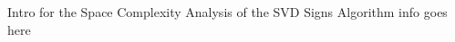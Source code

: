 \documentclass[../../ClusteringConnectionsMAIN.tex]{subfiles}
\begin{document}
\begin{flushleft}
\begin{large}

Intro for the Space Complexity Analysis of the SVD Signs Algorithm info goes here


\end{large}
\end{flushleft}
\end{document}
